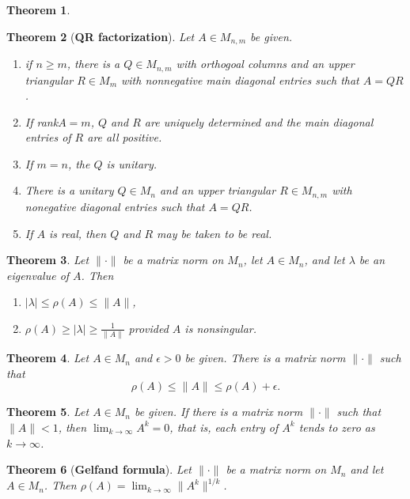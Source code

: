\documentclass[answers, a4paper, 12pt]{exam}
\newtheorem{theorem}{Theorem}[section]
\begin{document}
\begin{theorem}
    
\end{theorem}
\begin{theorem}[\textbf{QR factorization}]
    Let $A\in M_{n,m}$ be given.
    \begin{enumerate}
        \item if $n\geq m$, there is a $Q\in M_{n,m}$ with orthogoal columns and an upper triangular $R\in M_m$ with nonnegative main diagonal entries such that $A=QR$.
        \item If rank$A=m$, $Q$ and $R$ are uniquely determined and the main diagonal entries of $R$ are all positive.
        \item If $m=n$, the $Q$ is unitary.
        \item There is a unitary $Q\in M_n$ and an upper triangular $R\in M_{n,m}$ with nonegative diagonal entries such that $A=QR$.
        \item If $A$ is real, then $Q$ and $R$ may be taken to be real.
    \end{enumerate}
\end{theorem}
\begin{theorem}\label{thm1}
    Let $\|\cdot\|$ be a matrix norm on $M_n$, let $A\in M_n$, and let $\lambda$ be an eigenvalue of $A$. Then 
    \begin{enumerate}
        \item $|\lambda|\leq\rho(A)\leq\|A\|$,
        \item $\rho(A)\geq |\lambda|\geq\frac{1}{\|A\|}$ provided $A$ is nonsingular.
    \end{enumerate}
\end{theorem}\label{thm2}
\begin{theorem}
    Let $A\in M_n$ and $\epsilon>0$ be given. There is a matrix norm $\|\cdot\|$ such that $$\rho(A)\leq\|A\|\leq\rho(A)+\epsilon.$$
\end{theorem}
\begin{theorem}\label{thm3}
    Let $A\in M_n$ be given. If there is a matrix norm $\|\cdot\|$ such that $\|A\|<1$, then $\displaystyle\lim_{k\to\infty}{A^k}=0$, that is, each entry of $A^k$ tends to zero as $k\to\infty$.
\end{theorem}
\begin{theorem}[\textbf{Gelfand formula}]\label{thm4}
    Let $\|\cdot\|$ be a matrix norm on $M_n$ and let $A\in M_n$. Then $\rho(A)=\displaystyle\lim_{k\to\infty}{\|A^k\|^{1/k}}$.
\end{theorem}
\end{document}
